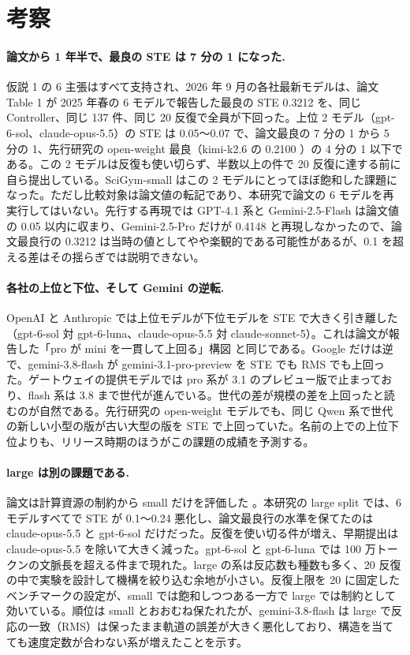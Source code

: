 \documentclass{article}
\providecommand{\unverified}[1]{#1}
\begin{document}
\section{考察}
\label{sec:discussion}
\paragraph{論文から 1 年半で、最良の STE は 7 分の 1 になった.}
仮説 1 の 6 主張はすべて支持され、2026 年 9 月の各社最新モデルは、論文 Table 1 が 2025 年春の 6 モデルで報告した最良の STE \unverified{0.3212} \cite[s1.p5]{duan-2025-measuring} を、同じ Controller、同じ 137 件、同じ 20 反復で全員が下回った。上位 2 モデル（gpt-6-sol、claude-opus-5.5）の STE は 0.05〜0.07 で、論文最良の 7 分の 1 から 5 分の 1、先行研究の open-weight 最良（kimi-k2.6 の \unverified{0.2100} \cite[s4.p2]{scigymrikyuopenmodels-2026-scigym}）の 4 分の 1 以下である。この 2 モデルは反復も使い切らず、半数以上の件で 20 反復に達する前に自ら提出している。SciGym-small はこの 2 モデルにとってほぼ飽和した課題になった。ただし比較対象は論文値の転記であり、本研究で論文の 6 モデルを再実行してはいない。先行する再現では GPT-4.1 系と Gemini-2.5-Flash は論文値の 0.05 以内に収まり、Gemini-2.5-Pro だけが \unverified{0.4148} \cite[s3.p2]{scigymtable1reproduction-2026-scigym} と再現しなかったので、論文最良行の 0.3212 は当時の値としてやや楽観的である可能性があるが、0.1 を超える差はその揺らぎでは説明できない。

\paragraph{各社の上位と下位、そして Gemini の逆転.}
OpenAI と Anthropic では上位モデルが下位モデルを STE で大きく引き離した（gpt-6-sol 対 gpt-6-luna、claude-opus-5.5 対 claude-sonnet-5）。これは論文が報告した「pro が mini を一貫して上回る」構図 \cite[s1.p6]{duan-2025-measuring} と同じである。Google だけは逆で、gemini-3.8-flash が gemini-3.1-pro-preview を STE でも RMS でも上回った。ゲートウェイの提供モデルでは pro 系が 3.1 のプレビュー版で止まっており、flash 系は 3.8 まで世代が進んでいる。世代の差が規模の差を上回ったと読むのが自然である。先行研究の open-weight モデルでも、同じ Qwen 系で世代の新しい小型の版が古い大型の版を STE で上回っていた。名前の上での上位下位よりも、リリース時期のほうがこの課題の成績を予測する。

\paragraph{large は別の課題である.}
論文は計算資源の制約から small だけを評価した \cite[s1.p2]{duan-2025-measuring}。本研究の large split では、6 モデルすべてで STE が 0.1〜0.24 悪化し、論文最良行の水準を保てたのは claude-opus-5.5 と gpt-6-sol だけだった。反復を使い切る件が増え、早期提出は claude-opus-5.5 を除いて大きく減った。gpt-6-sol と gpt-6-luna では 100 万トークンの文脈長を超える件まで現れた。large の系は反応数も種数も多く、20 反復の中で実験を設計して機構を絞り込む余地が小さい。反復上限を 20 に固定したベンチマークの設定が、small では飽和しつつある一方で large では制約として効いている。順位は small とおおむね保たれたが、gemini-3.8-flash は large で反応の一致（RMS）は保ったまま軌道の誤差が大きく悪化しており、構造を当てても速度定数が合わない系が増えたことを示す。
\end{document}
